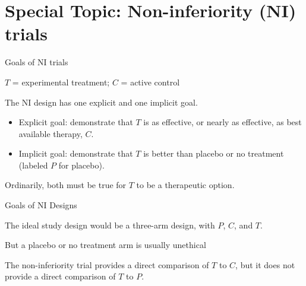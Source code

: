 \documentclass[ignorenonframetext,]{beamer}
\providecommand{\tightlist}{%
  \setlength{\itemsep}{0pt}\setlength{\parskip}{0pt}}
\begin{document}
\hypertarget{special-topic-non-inferiority-ni-trials}{%
\section{Special Topic: Non-inferiority (NI)
trials}\label{special-topic-non-inferiority-ni-trials}}

\begin{frame}{%
\protect\hypertarget{goals-of-ni-trials}{%
Goals of NI trials}}

\(T\) = experimental treatment; \(C\) = active control

The NI design has one explicit and one implicit goal.

\begin{itemize}
\tightlist
\item
  Explicit goal: demonstrate that \(T\) is as effective, or nearly as
  effective, as best available therapy, \(C\).\\
\item
  Implicit goal: demonstrate that \(T\) is better than placebo or no
  treatment (labeled \(P\) for placebo).
\end{itemize}

Ordinarily, both must be true for \(T\) to be a therapeutic option.

\end{frame}

\begin{frame}{%
\protect\hypertarget{goals-of-ni-designs}{%
Goals of NI Designs}}

The ideal study design would be a three-arm design, with \(P\), \(C\),
and \(T\).

But a placebo or no treatment arm is usually unethical

The non-inferiority trial provides a direct comparison of \(T\) to
\(C\), but it does not provide a direct comparison of \(T\) to \(P\).

\end{frame}
\end{document}
